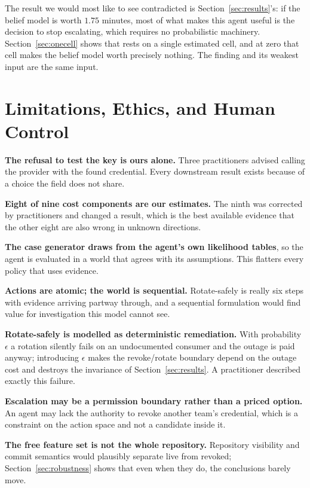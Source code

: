 \documentclass{article}
\begin{document}
The result we would most like to see contradicted is
Section~\ref{sec:results}'s: if the belief model is worth $1.75$ minutes, most
of what makes this agent useful is the decision to stop escalating, which
requires no probabilistic machinery. Section~\ref{sec:onecell} shows that rests
on a single estimated cell, and at zero that cell makes the belief model worth
precisely nothing. The finding and its weakest input are the same input.

\section{Limitations, Ethics, and Human Control}
\label{sec:limitations}

\textbf{The refusal to test the key is ours alone.} Three practitioners advised
calling the provider with the found credential. Every downstream result exists
because of a choice the field does not share.

\textbf{Eight of nine cost components are our estimates.} The ninth was
corrected by practitioners and changed a result, which is the best available
evidence that the other eight are also wrong in unknown directions.

\textbf{The case generator draws from the agent's own likelihood tables}, so the
agent is evaluated in a world that agrees with its assumptions. This flatters
every policy that uses evidence.

\textbf{Actions are atomic; the world is sequential.} Rotate-safely is really
six steps with evidence arriving partway through, and a sequential formulation
would find value for investigation this model cannot see.

\textbf{Rotate-safely is modelled as deterministic remediation.} With
probability $\epsilon$ a rotation silently fails on an undocumented consumer and
the outage is paid anyway; introducing $\epsilon$ makes the revoke/rotate
boundary depend on the outage cost and destroys the invariance of
Section~\ref{sec:results}. A practitioner described exactly this failure.

\textbf{Escalation may be a permission boundary rather than a priced option.} An
agent may lack the authority to revoke another team's credential, which is a
constraint on the action space and not a candidate inside it.

\textbf{The free feature set is not the whole repository.} Repository visibility
and commit semantics would plausibly separate live from revoked;
Section~\ref{sec:robustness} shows that even when they do, the conclusions
barely move.
\end{document}
